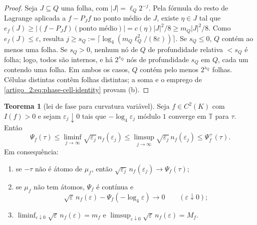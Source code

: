 \documentclass[12pt,a4paper]{article}
\theoremstyle{preciso}
\theoremstyle{definition}
\theoremstyle{preciso}
\newtheorem{theorem}[teorema]{Teorema}
\theoremstyle{preciso}
\theoremstyle{preciso}
\theoremstyle{preciso}
\theoremstyle{definition}
\theoremstyle{preciso}
\theoremstyle{definition}
\theoremstyle{preciso}
\theoremstyle{preciso}
\theoremstyle{definition}
\begin{document}
\begin{proof}
Seja $J\subseteq Q$ uma folha, com $|J|=\ell_Q2^{-j}$. Pela fórmula do resto
de Lagrange aplicada a $f-P_Jf$ no ponto médio de $J$, existe $\eta\in J$
tal que
$e_f(J)\ge|(f-P_Jf)(\text{ponto médio})|=c(\eta)|J|^2/8\ge m_Q|J|^2/8$.
Como $e_f(J)\le\varepsilon$, resulta $j\ge s_Q:=\lceil\log_4(m_Q\ell_Q^2/(8\varepsilon))\rceil$.
Se $s_Q\le0$, $Q$ contém ao menos uma folha. Se $s_Q>0$, nenhum nó de $Q$ de
profundidade relativa $<s_Q$ é folha; logo, todos são internos, e há $2^{s_Q}$
nós de profundidade $s_Q$ em $Q$, cada um contendo uma folha. Em ambos os casos,
$Q$ contém pelo menos $2^{s_Q}$ folhas. Células distintas contêm folhas
distintas; a soma e o emprego de \eqref{artigo_2:eq:phase-cell-identity} provam (b).
\end{proof}

\begin{theorem}[lei de fase para curvatura variável]\label{map:artigo_2:12.7}
\label{artigo_2:thm:phase-law}
Seja $f\in C^2(K)$ com $I(f)>0$ e sejam $\varepsilon_j\downarrow0$ tais que
$-\log_4\varepsilon_j$ módulo $1$ converge em $\mathbb T$ para $\tau$. Então
\begin{equation}
 \Psi_f(\tau)\le\liminf_{j\to\infty}\sqrt{\varepsilon_j}\,n_f(\varepsilon_j)
 \le\limsup_{j\to\infty}\sqrt{\varepsilon_j}\,n_f(\varepsilon_j)\le\Psi_f^+(\tau).
 \label{artigo_2:eq:phase-law}
\end{equation}
Em consequência:
\begin{enumerate}[label=(\roman*)]
\item se $-\tau$ não é átomo de $\mu_f$, então
 $\sqrt{\varepsilon_j}\,n_f(\varepsilon_j)\to\Psi_f(\tau)$;
\item se $\mu_f$ não tem átomos, $\Psi_f$ é contínua e
 \[
  \sqrt\varepsilon\,n_f(\varepsilon)-\Psi_f(-\log_4\varepsilon)\to0
  \qquad(\varepsilon\downarrow0);
 \]
\item $\liminf_{\varepsilon\downarrow0}\sqrt\varepsilon\,n_f(\varepsilon)=m_f$ e
 $\limsup_{\varepsilon\downarrow0}\sqrt\varepsilon\,n_f(\varepsilon)=M_f$.
\end{enumerate}
\end{theorem}
\end{document}
